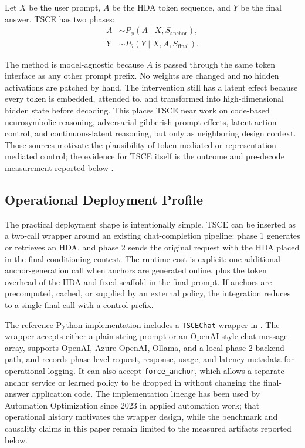 \documentclass[11pt]{article}
\newcommand{\tsce}{\textsc{TSCE}}
\newcommand{\hda}{\textsc{HDA}}
\begin{document}
Let $X$ be the user prompt, $A$ be the \hda{} token sequence, and $Y$ be the final answer. \tsce{} has two phases:
\begin{align}
    A &\sim P_{\phi}(A \mid X, S_{\mathrm{anchor}}), \\
    Y &\sim P_{\theta}(Y \mid X, A, S_{\mathrm{final}}).
\end{align}

The method is model-agnostic because $A$ is passed through the same token interface as any other prompt prefix. No weights are changed and no hidden activations are patched by hand. The intervention still has a latent effect because every token is embedded, attended to, and transformed into high-dimensional hidden state before decoding. This places \tsce{} near work on code-based neurosymbolic reasoning, adversarial gibberish-prompt effects, latent-action control, and continuous-latent reasoning, but only as neighboring design context. Those sources motivate the plausibility of token-mediated or representation-mediated control; the evidence for \tsce{} itself is the outcome and pre-decode measurement reported below \cite{code-anchoring,gibberish-prompts,latent-actions,coconut,compressed-cot}.

\subsection{Operational Deployment Profile}

The practical deployment shape is intentionally simple. \tsce{} can be inserted as a two-call wrapper around an existing chat-completion pipeline: phase 1 generates or retrieves an \hda{}, and phase 2 sends the original request with the \hda{} placed in the final conditioning context. The runtime cost is explicit: one additional anchor-generation call when anchors are generated online, plus the token overhead of the \hda{} and fixed scaffold in the final prompt. If anchors are precomputed, cached, or supplied by an external policy, the integration reduces to a single final call with a control prefix.

The reference Python implementation includes a \texttt{TSCEChat} wrapper in . The wrapper accepts either a plain string prompt or an OpenAI-style chat message array, supports OpenAI, Azure OpenAI, Ollama, and a local phase-2 backend path, and records phase-level request, response, usage, and latency metadata for operational logging. It can also accept \texttt{force\_anchor}, which allows a separate anchor service or learned policy to be dropped in without changing the final-answer application code. The implementation lineage has been used by Automation Optimization since 2023 in applied automation work; that operational history motivates the wrapper design, while the benchmark and causality claims in this paper remain limited to the measured artifacts reported below.
\end{document}
